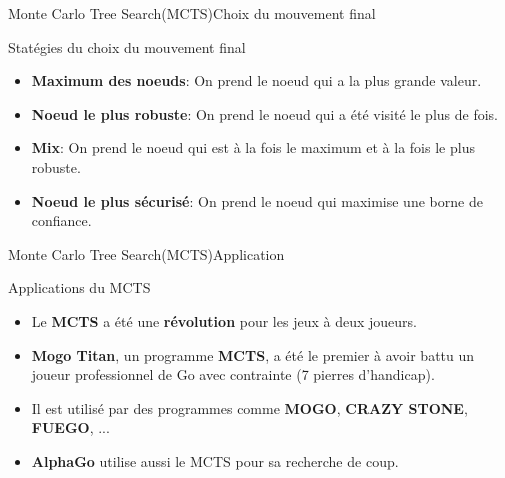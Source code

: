 \begin{frame}{Monte Carlo Tree Search(MCTS)}{Choix du mouvement final}
	\begin{block}{Statégies du choix du mouvement final}
		\begin{itemize}
			\item \textbf{Maximum des noeuds}: On prend le noeud qui a la plus grande valeur.
			\item \textbf{Noeud le plus robuste}: On prend le noeud qui a été visité le plus de fois.
			\item \textbf{Mix}: On prend le noeud qui est à la fois le maximum et à la fois le plus robuste.
			\item \textbf{Noeud le plus sécurisé}: On prend le noeud qui maximise une borne de confiance.
		\end{itemize}
	\end{block}
\end{frame}

\begin{frame}{Monte Carlo Tree Search(MCTS)}{Application}
	\begin{block}{Applications du MCTS}
		\begin{itemize}
			\item Le \textbf{MCTS} a été une \textbf{révolution} pour les jeux à deux joueurs.
			\item \textbf{Mogo Titan}, un programme \textbf{MCTS}, a été le premier à avoir battu un joueur professionnel de Go avec contrainte (7 pierres d'handicap).
			\item Il est utilisé par des programmes comme \textbf{MOGO}, \textbf{CRAZY STONE}, \textbf{FUEGO}, ...
			\item \textbf{AlphaGo} utilise aussi le MCTS pour sa recherche de coup.

		\end{itemize}
	\end{block}
\end{frame}